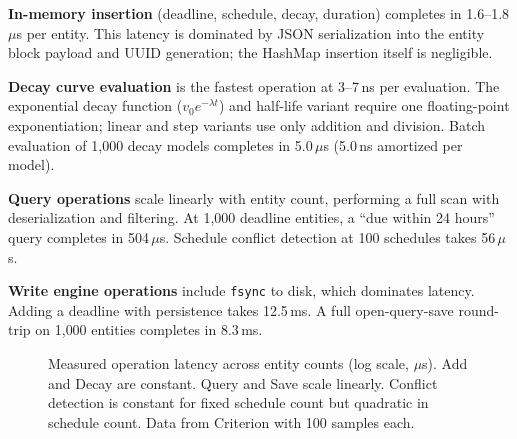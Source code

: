 \documentclass[10pt, twocolumn]{article}
\begin{document}
\textbf{In-memory insertion} (deadline, schedule, decay, duration) completes in 1.6--1.8\,$\mu$s per entity. This latency is dominated by JSON serialization into the entity block payload and UUID generation; the HashMap insertion itself is negligible.

\textbf{Decay curve evaluation} is the fastest operation at 3--7\,ns per evaluation. The exponential decay function ($v_0 e^{-\lambda t}$) and half-life variant require one floating-point exponentiation; linear and step variants use only addition and division. Batch evaluation of 1{,}000 decay models completes in 5.0\,$\mu$s (5.0\,ns amortized per model).

\textbf{Query operations} scale linearly with entity count, performing a full scan with deserialization and filtering. At 1{,}000 deadline entities, a ``due within 24 hours'' query completes in 504\,$\mu$s. Schedule conflict detection at 100 schedules takes 56\,$\mu$s.

\textbf{Write engine operations} include \texttt{fsync} to disk, which dominates latency. Adding a deadline with persistence takes 12.5\,ms. A full open-query-save round-trip on 1{,}000 entities completes in 8.3\,ms.

\begin{figure}[t]
\centering
{}
\caption{Measured operation latency across entity counts (log scale, $\mu$s). Add and Decay are constant. Query and Save scale linearly. Conflict detection is constant for fixed schedule count but quadratic in schedule count. Data from Criterion with 100 samples each.}
\label{fig:latency_chart}
\end{figure}
\end{document}
